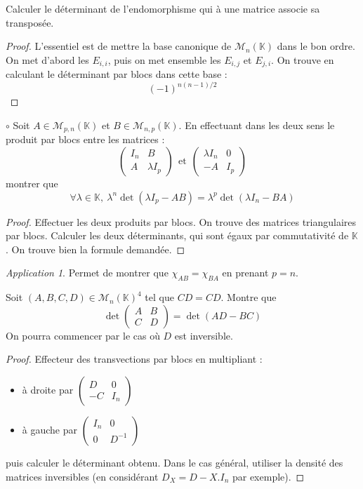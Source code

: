 \documentclass[french,a4paper]{article}
\newcommand{\K}{\mathbb{K}}
\newcommand{\inv}{^{-1}}
\theoremstyle{plain}
\theoremstyle{definition}
\theoremstyle{remark}
\newtheorem*{app}{Application}
\begin{document}
\begin{ex}{}
	Calculer le déterminant de l'endomorphisme qui à une matrice associe sa transposée.
\end{ex}
\begin{proof}
	L'essentiel est de mettre la base canonique de $\mathcal{M}_n(\K)$ dans le bon ordre. On met d'abord les $E_{i,i}$, puis on met ensemble les $E_{i,j}$ et $E_{j,i}$. On trouve en calculant le déterminant par blocs dans cette base : $$(-1)^{n(n-1)/2}$$
\end{proof}

\begin{ex}{$\circ$}
	Soit $A\in\mathcal{M}_{p,n}(\K)$ et $B\in\mathcal{M}_{n,p}(\K)$. En effectuant dans les deux sens le produit par blocs entre les matrices : $$\begin{pmatrix}
		I_n&B\\
		A&\lambda I_p
	\end{pmatrix}\ \ \text{et} \ \ \begin{pmatrix}
		\lambda I_n&0\\
		-A&I_p
	\end{pmatrix}$$ montrer que $$\forall\lambda\in\K,\ \lambda^n\det(\lambda I_p-AB)=\lambda^p\det(\lambda I_n-BA)$$
\end{ex}
\begin{proof}
	Effectuer les deux produits par blocs. On trouve des matrices triangulaires par blocs. Calculer les deux déterminants, qui sont égaux par commutativité de $\K$. On trouve bien la formule demandée.
\end{proof}
\begin{app}
	Permet de montrer que $\chi_{AB}=\chi_{BA}$ en prenant $p=n$.
\end{app}

\begin{ex}{}
	Soit $(A,B,C,D)\in\mathcal{M}_n(\K)^4$ tel que $CD=CD$. Montre que $$\det\begin{pmatrix}
		A&B\\
		C&D
	\end{pmatrix}=\det(AD-BC)$$ On pourra commencer par le cas où $D$ est inversible.
\end{ex}
\begin{proof}
	Effecteur des transvections par blocs en multipliant :
	\begin{itemize}
		\item à droite par $\displaystyle\begin{pmatrix}
			D&0\\
			-C&I_n
		\end{pmatrix}$
		\item à gauche par $\displaystyle\begin{pmatrix}
			I_n&0\\
			0&D\inv
		\end{pmatrix}$
	\end{itemize} puis calculer le déterminant obtenu. Dans le cas général, utiliser la densité des matrices inversibles (en considérant $D_X=D-X.I_n$ par exemple).
\end{proof}
\end{document}
